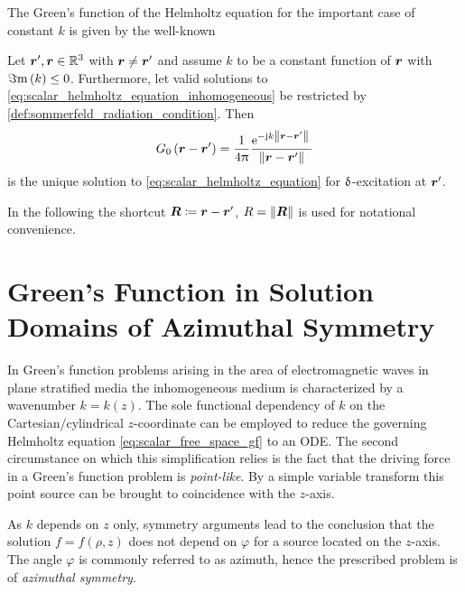 The Green's function of the Helmholtz equation for the important case of
constant $k$ is given by the well-known \cite[pp.~282]{Jackson2013}
\begin{corollary}\label{coll:free_space_gf}
	Let $\rsrc, \robs \in \R^3$ with $\robs \neq \rsrc$ and assume
	$k$ to be a constant function of $\robs$ with $\Im\mathrm{m}\left(k\right) \leq 0$.
	Furthermore, let valid solutions to
	\eqref{eq:scalar_helmholtz_equation_inhomogeneous} be restricted by
	\cref{def:sommerfeld_radiation_condition}.
	Then
	\begin{equation}\label{eq:scalar_free_space_gf}
		G_0 \left( \rdiff \right) =
		\frac{1}{4\pi}
		\frac{\exp{-\im k \rdiffNorm}}{\rdiffNorm}
	\end{equation}
	is the unique solution to \eqref{eq:scalar_helmholtz_equation} for
	$\operatorname{\updelta}$-excitation at $\rsrc$.
\end{corollary}

In the following the shortcut $\rdiffSymbol \coloneqq \rdiff$,
$\rdiffNormSymbol = \norm{\pvec{R}}$ is used for notational convenience.








\section{Green's Function in Solution Domains of Azimuthal Symmetry}
\label{sec:helmholtz_eq_az_symmetry}

In Green's function problems arising in the area of electromagnetic waves
in plane stratified media the inhomogeneous medium is characterized by
a wavenumber $k = k\left(z\right)$.
The sole functional dependency of $k$ on the Cartesian/cylindrical
$z$-coordinate can be employed to reduce the governing Helmholtz
equation \eqref{eq:scalar_free_space_gf} to an \ac{ODE}.
The second circumstance on which this simplification relies is the fact that 
the driving force in a Green's function problem is \emph{point-like}.
By a simple variable transform this point source can be brought to
coincidence with the $z$-axis.

As $k$ depends on $z$ only, symmetry arguments lead to the conclusion that
the solution $f = f \left(\rho, z\right)$ does not depend on $\varphi$
for a source located on the $z$-axis.
The angle $\varphi$ is commonly referred to as azimuth, hence the prescribed
problem is of \emph{azimuthal symmetry}.

